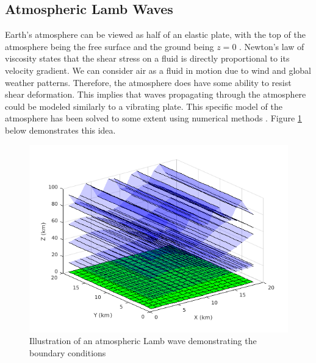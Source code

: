 \documentclass[twoside]{bsu-ms}
\begin{document}
\subsection{Atmospheric Lamb Waves}\label{subsec:1.1.2}
Earth's atmosphere can be viewed as half of an elastic plate, with the top of the atmosphere being the free surface and the ground being $z=0$ \cite{lamb1932hydrodynamics}. Newton's law of viscosity states that the shear stress on a fluid is directly proportional to its velocity gradient. We can consider air as a fluid in motion due to wind and global weather patterns. Therefore, the atmosphere does have some ability to resist shear deformation. This implies that waves propagating through the atmosphere could be modeled similarly to a vibrating plate. This specific model of the atmosphere has been solved to some extent using numerical methods \cite{garrett1969atmospheric}. Figure \ref{fig:1.1} below demonstrates this idea.
\begin{figure}[!htbp]
	\vspace{-15pt}
	\centering
	\includegraphics[width=\textwidth]{images/Lamb_model.png}
	\caption{Illustration of an atmospheric Lamb wave demonstrating the boundary conditions}
	\label{fig:1.1}
\end{figure}
\end{document}
